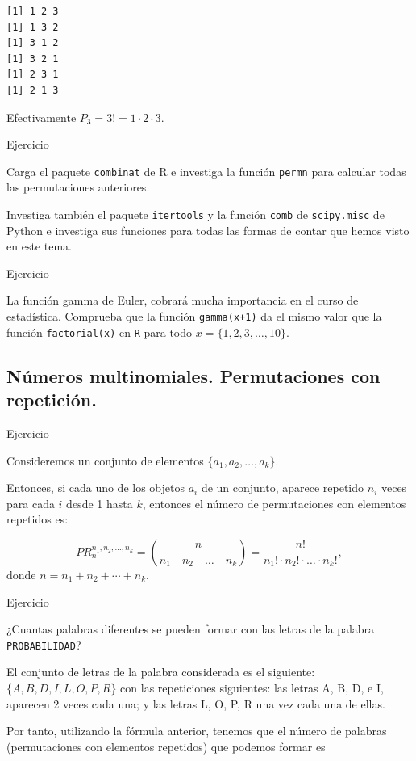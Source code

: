 \documentclass[
  letterpaper,
  DIV=11,
  numbers=noendperiod]{scrreprt}
\begin{document}
\begin{verbatim}
[1] 1 2 3
[1] 1 3 2
[1] 3 1 2
[1] 3 2 1
[1] 2 3 1
[1] 2 1 3
\end{verbatim}

Efectivamente \(P_3=3!=1\cdot  2\cdot 3.\)

Ejercicio

Carga el paquete \texttt{combinat} de R e investiga la función
\texttt{permn} para calcular todas las permutaciones anteriores.

Investiga también el paquete \texttt{itertools} y la función
\texttt{comb} de \texttt{scipy.misc} de Python e investiga sus funciones
para todas las formas de contar que hemos visto en este tema.

Ejercicio

La función gamma de Euler, cobrará mucha importancia en el curso de
estadística. Comprueba que la función \texttt{gamma(x+1)} da el mismo
valor que la función \texttt{factorial(x)} en \texttt{R} para todo
\(x = \{1,2,3,\ldots,10\}\).

\subsection{Números multinomiales. Permutaciones con
repetición.}\label{nuxfameros-multinomiales.-permutaciones-con-repeticiuxf3n.}

Ejercicio

Consideremos un conjunto de elementos \(\{a_1, a_2, \ldots, a_k\}\).

Entonces, si cada uno de los objetos \(a_i\) de un conjunto, aparece
repetido \(n_i\) veces para cada \(i\) desde 1 hasta \(k\), entonces el
número de permutaciones con elementos repetidos es:

\[PR_n^{n_1,n_2,\ldots,n_k} = {{n}\choose {n_1\quad n_2 \quad\ldots \quad n_k}}=\frac{n!}{n_1!\cdot n_2!\cdot \ldots \cdot n_k!},\]
donde \(n=n_1+n_2+\cdots+n_k\).

Ejercicio

¿Cuantas palabras diferentes se pueden formar con las letras de la
palabra \texttt{PROBABILIDAD}?

El conjunto de letras de la palabra considerada es el siguiente:
\(\{A, B, D, I, L, O, P, R\}\) con las repeticiones siguientes: las
letras A, B, D, e I, aparecen 2 veces cada una; y las letras L, O, P, R
una vez cada una de ellas.

Por tanto, utilizando la fórmula anterior, tenemos que el número de
palabras (permutaciones con elementos repetidos) que podemos formar es
\end{document}
